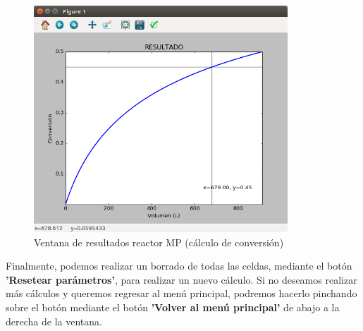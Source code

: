 \begin{figure}[h!]
	\begin{center}
		\includegraphics[width=0.85\textwidth]{./imagenes/reactor_fp/mezcla_perfecta4.png}\caption{Ventana de resultados reactor MP (cálculo de conversión)}\label{fig:ventana_graficas_conversion}
	\end{center}
\end{figure}

Finalmente, podemos realizar un borrado de todas las celdas, mediante el botón \textbf{'Resetear parámetros'}, para realizar un nuevo cálculo. Si no deseamos realizar más cálculos y queremos regresar al menú principal, podremos hacerlo pinchando sobre el botón mediante el botón \textbf{'Volver al menú principal'} de abajo a la derecha de la ventana.